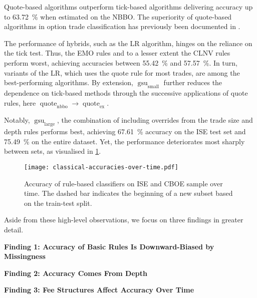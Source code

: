 Quote-based algorithms outperform tick-based algorithms delivering accuracy up to \SI{63.72}{\percent} when estimated on the \gls{NBBO}. The superiority of quote-based algorithms in option trade classification has previously been documented in \textcites[][891]{savickasInferringDirectionOption2003}[][3]{grauerOptionTradeClassification2022}.

The performance of hybrids, such as the \gls{LR} algorithm, hinges on the reliance on the tick test. Thus, the \gls{EMO} rules and to a lesser extent the \gls{CLNV} rules perform worst, achieving accuracies between \SI{55.42}{\percent} and \SI{57.57}{\percent}. In turn, variants of the \gls{LR}, which uses the quote rule for most trades, are among the best-performing algorithms. By extension, $\operatorname{gsu}_{\mathrm{small}}$ further reduces the dependence on tick-based methods through the successive applications of quote rules, here $\operatorname{quote}_{\mathrm{nbbo}} \to \operatorname{quote}_{\mathrm{ex}}$.

Notably, $\operatorname{gsu}_{\mathrm{large}}$, the combination of \textcite[][33]{grauerOptionTradeClassification2022} including overrides from the trade size and depth rules performs best, achieving \SI{67.61}{\percent} accuracy on the \gls{ISE} test set and \SI{75.49}{\percent} on the entire dataset. Yet, the performance deteriorates most sharply between sets, as visualised in \cref{fig:classical-accuracies-over-time}.

\begin{figure}[ht]
    \centering
    \texttt{[image: classical-accuracies-over-time.pdf]}
    \caption[Accuracy Of Rule-Based Classifiers On  and  Over Time]{Accuracy of rule-based classifiers on \gls{ISE} and \gls{CBOE} sample over time. The dashed bar \myline{} indicates the beginning of a new subset based on the train-test split.}
    \label{fig:classical-accuracies-over-time}
\end{figure}

Aside from these high-level observations, we focus on three findings in greater detail.

\textbf{Finding 1: Accuracy of Basic Rules Is Downward-Biased by Missingness}


\textbf{Finding 2: Accuracy Comes From Depth}


\textbf{Finding 3: Fee Structures Affect Accuracy Over Time}

